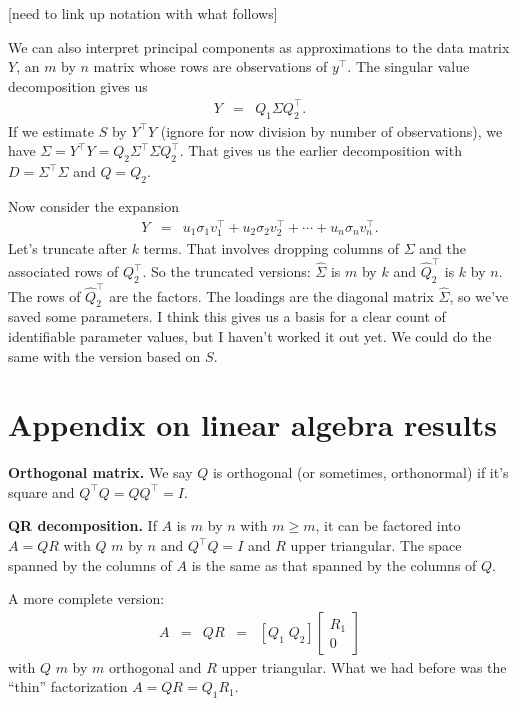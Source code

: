 \documentclass[11pt]{article}
\begin{document}
[need to link up notation with what follows]

We can also interpret principal components as approximations to the
data matrix $Y$,
an $m$ by $n$ matrix whose rows are observations of $y^\top$.
The singular value decomposition gives us
\begin{eqnarray*}
    Y &=& Q_1 \Sigma Q_2^\top .
\end{eqnarray*}
If we estimate $S$ by $Y^\top Y$
(ignore for now division by number of observations),
we have $ \Sigma = Y^\top Y = Q_2 \Sigma^\top \Sigma Q_2^\top$.
That gives us the earlier decomposition with $D = \Sigma^\top \Sigma$
and $Q = Q_2$.

Now consider  the expansion
\begin{eqnarray*}
    Y &=&  u_1 \sigma_1 v_1^\top + u_2 \sigma_2 v_2^\top + \cdots
        + u_n \sigma_n v_n^\top .
\end{eqnarray*}
Let's truncate after $k$ terms.
That involves dropping columns of $\Sigma$ and the associated rows of
$Q_2^\top$.
So the truncated versions:
$\widehat{\Sigma}$ is $m$ by $k$ and
$\widehat{Q}_2^\top $ is $k$ by $n$.
The rows of $\widehat{Q}_2^\top $ are the factors.
The loadings are the diagonal matrix $\widehat{\Sigma}$,
so we've saved some parameters.
I think this gives us a basis for a clear
count of identifiable parameter values, but I haven't worked it out yet.
We could do the same with the version based on $S$.


\appendix
\section{Appendix on linear algebra results}

{\bf Orthogonal matrix.}  We say $Q$ is orthogonal (or sometimes, orthonormal)
if it's square and $ Q^\top Q = Q Q^\top = I$.

{\bf QR decomposition.}
If $A$ is $m$ by $n$ with $m \ge m$, it can be factored into $A = QR$
with $Q$ $m$ by $n$ and $Q^\top Q = I$ and $R$ upper triangular.
The space spanned by the columns of $A$ is the same as that spanned by the columns of $Q$.

A more complete version:
\begin{eqnarray*}
    A &=& QR \;\;=\;\;
        \left[ Q_1 \; Q_2 \right]
        \left[
        \begin{array}{c}
        R_1 \\ 0
        \end{array}
        \right]
\end{eqnarray*}
with $Q$ $m$ by $m$ orthogonal and $R$ upper triangular.
What we had before was the ``thin'' factorization $A = QR = Q_1 R_1 $.
\end{document}
